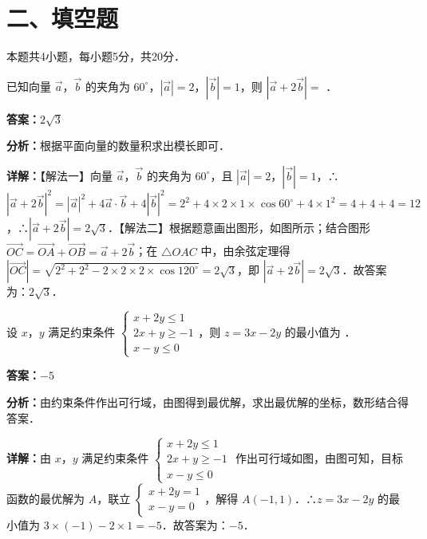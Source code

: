 \section*{二、填空题}
本题共4小题，每小题5分，共20分．

\begin{question}[points=5]
已知向量 $\vec{a}$，$\vec{b}$ 的夹角为 $60^\circ$，$|\vec{a}|=2$，$|\vec{b}|=1$，则 $|\vec{a}+2\vec{b}|=$ ．
\fillin[{$2\sqrt{3}$}]
\begin{solution}
\textbf{答案：}$2\sqrt{3}$

\textbf{分析：}根据平面向量的数量积求出模长即可．

\textbf{详解：}【解法一】向量 $\vec{a}$，$\vec{b}$ 的夹角为 $60^\circ$，且 $|\vec{a}|=2$，$|\vec{b}|=1$，∴$|\vec{a}+2\vec{b}|^2=|\vec{a}|^2+4\vec{a}\cdot\vec{b}+4|\vec{b}|^2=2^2+4\times2\times1\times\cos60^\circ+4\times1^2=4+4+4=12$，∴$|\vec{a}+2\vec{b}|=2\sqrt{3}$．【解法二】根据题意画出图形，如图所示；结合图形 $\overrightarrow{OC}=\overrightarrow{OA}+\overrightarrow{OB}=\vec{a}+2\vec{b}$；在 $\triangle OAC$ 中，由余弦定理得 $|\overrightarrow{OC}|=\sqrt{2^2+2^2-2\times2\times2\times\cos120^\circ}=2\sqrt{3}$，即 $|\vec{a}+2\vec{b}|=2\sqrt{3}$．故答案为：$2\sqrt{3}$．
\end{solution}
\end{question}

\begin{question}[points=5]
设 $x$，$y$ 满足约束条件 $\begin{cases} x+2y\leq 1 \\ 2x+y\geq -1 \\ x-y\leq 0 \end{cases}$，则 $z=3x-2y$ 的最小值为 ．
\fillin[{$-5$}]
\begin{solution}
\textbf{答案：}$-5$

\textbf{分析：}由约束条件作出可行域，由图得到最优解，求出最优解的坐标，数形结合得答案．

\textbf{详解：}由 $x$，$y$ 满足约束条件 $\begin{cases} x+2y\leq 1 \\ 2x+y\geq -1 \\ x-y\leq 0 \end{cases}$ 作出可行域如图，由图可知，目标函数的最优解为 $A$，联立 $\begin{cases} x+2y=1 \\ x-y=0 \end{cases}$，解得 $A(-1,1)$．∴$z=3x-2y$ 的最小值为 $3\times(-1)-2\times1=-5$．故答案为：$-5$．
\end{solution}
\end{question}

